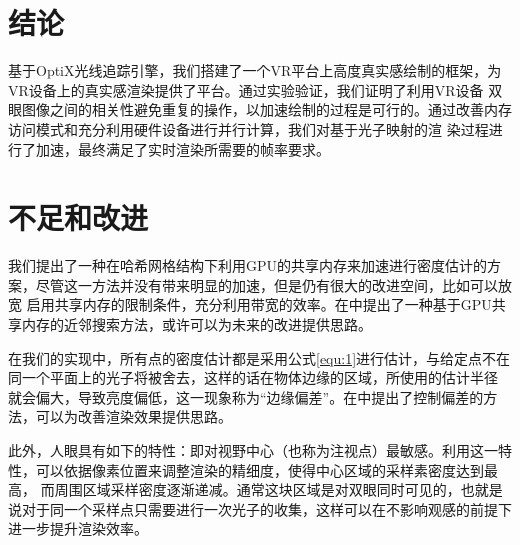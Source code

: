 \documentclass[UTF8]{ctexart}
\begin{document}
\section{结论}
    基于OptiX光线追踪引擎，我们搭建了一个VR平台上高度真实感绘制的框架，为VR设备上的真实感渲染提供了平台。通过实验验证，我们证明了利用VR设备
    双眼图像之间的相关性避免重复的操作，以加速绘制的过程是可行的。通过改善内存访问模式和充分利用硬件设备进行并行计算，我们对基于光子映射的渲
    染过程进行了加速，最终满足了实时渲染所需要的帧率要求。

\section{不足和改进}
    我们提出了一种在哈希网格结构下利用GPU的共享内存来加速进行密度估计的方案，尽管这一方法并没有带来明显的加速，但是仍有很大的改进空间，比如可以放宽
    启用共享内存的限制条件，充分利用带宽的效率。在\cite{gross2019fast}中提出了一种基于GPU共享内存的近邻搜索方法，或许可以为未来的改进提供思路。

    在我们的实现中，所有点的密度估计都是采用公式\ref{equ:1}进行估计，与给定点不在同一个平面上的光子将被舍去，这样的话在物体边缘的区域，所使用的估计半径
    就会偏大，导致亮度偏低，这一现象称为“边缘偏差”。在\cite{biasControl}中提出了控制偏差的方法，可以为改善渲染效果提供思路。

    此外，人眼具有如下的特性：即对视野中心（也称为注视点\cite{Guenter2012Foveated}）最敏感。利用这一特性，可以依据像素位置来调整渲染的精细度，使得中心区域的采样素密度达到最高，
    而周围区域采样密度逐渐递减。通常这块区域是对双眼同时可见的，也就是说对于同一个采样点只需要进行一次光子的收集，这样可以在不影响观感的前提下进一步提升渲染效率。

\end{document}
